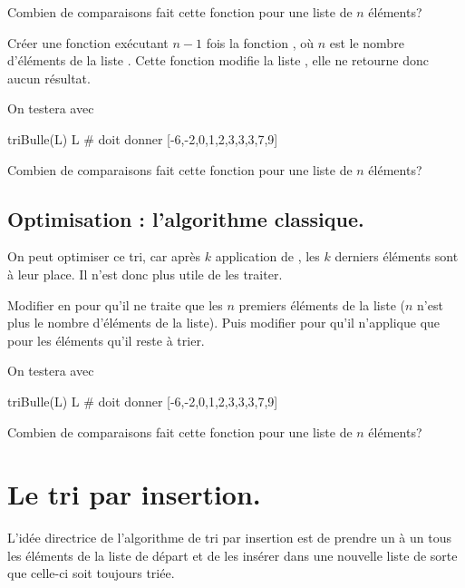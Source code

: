 \documentclass[french,12pt,twoside]{VcCours}
\begin{document}
\begin{Exercice}
Combien de comparaisons fait cette fonction  pour une 
liste de $n$ éléments?
\end{Exercice}

\begin{Exercice}
Créer une fonction  exécutant $n-1$ fois la fonction 
, où $n$ est le nombre d'éléments de la liste 
. Cette fonction modifie la liste , elle ne retourne donc 
aucun résultat.

On testera avec 
\end{Exercice}
\begin{Python}
triBulle(L)
L # doit donner [-6,-2,0,1,2,3,3,3,7,9]
\end{Python}

\begin{Exercice}
Combien de comparaisons fait cette fonction pour une liste de $n$ éléments?
\end{Exercice}

\subsection{Optimisation : l'algorithme classique.}

On peut optimiser ce tri, car après $k$ application de 
, les $k$ derniers éléments sont à leur place. 
Il n'est donc plus utile de les traiter.

\begin{Exercice}
Modifier  en  pour 
qu'il ne traite que les $n$ premiers éléments de la liste ($n$ n'est plus le 
nombre d'éléments de la liste). Puis modifier 
 pour qu'il n'applique  
que pour les éléments qu'il reste à trier.

On testera avec 
\end{Exercice}
\begin{Python}
triBulle(L)
L # doit donner [-6,-2,0,1,2,3,3,3,7,9]
\end{Python}

\begin{Exercice}
Combien de comparaisons fait cette fonction pour une liste de $n$ éléments?
\end{Exercice}



\section{Le tri par insertion.}
L'idée directrice de l'algorithme de tri par insertion est de prendre un à un 
tous les éléments de la liste de départ et de les insérer dans une nouvelle 
liste de sorte que celle-ci soit toujours triée.
\end{document}
